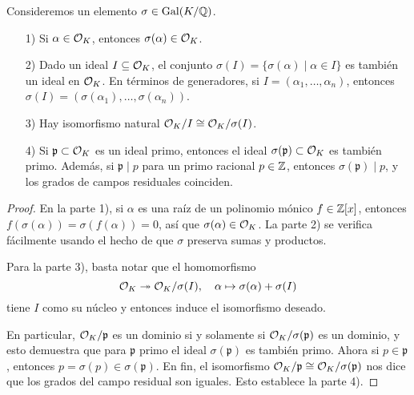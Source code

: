 \begin{proposicion}
  \label{prop:accion-sobre-los-ideales}
  Consideremos un elemento $\sigma \in \operatorname{Gal} (K/\mathbb{Q})$.

  \begin{enumerate}
  \item[1)] Si $\alpha \in \mathcal{O}_K$, entonces $\sigma (\alpha) \in \mathcal{O}_K$.

  \item[2)] Dado un ideal $I \subseteq \mathcal{O}_K$, el conjunto
    $\sigma (I) = \{ \sigma (\alpha) \mid \alpha \in I \}$
    es también un ideal en $\mathcal{O}_K$. En términos de generadores, si
    $I = (\alpha_1, \ldots, \alpha_n)$, entonces
    $\sigma (I) = (\sigma(\alpha_1), \ldots, \sigma(\alpha_n))$.

  \item[3)] Hay isomorfismo natural
    $\mathcal{O}_K/I \cong \mathcal{O}_K/\sigma(I)$.

  \item[4)] Si $\mathfrak{p} \subset \mathcal{O}_K$ es un ideal primo, entonces
    el ideal $\sigma (\mathfrak{p}) \subset \mathcal{O}_K$ es también primo.
    Además, si $\mathfrak{p} \mid p$ para un primo racional $p \in \mathbb{Z}$,
    entonces $\sigma(\mathfrak{p}) \mid p$, y los grados de campos residuales
    coinciden.
  \end{enumerate}

  \begin{proof}
    En la parte 1), si $\alpha$ es una raíz de un polinomio mónico
    $f \in \mathbb{Z} [x]$, entonces $f (\sigma (\alpha)) = \sigma (f (\alpha)) = 0$,
    así que $\sigma (\alpha) \in \mathcal{O}_K$. La parte 2) se verifica fácilmente
    usando el hecho de que $\sigma$ preserva sumas y productos.

    Para la parte 3), basta notar que el homomorfismo
    \[ \mathcal{O}_K \twoheadrightarrow \mathcal{O}_K/\sigma(I), \quad
       \alpha \mapsto \sigma (\alpha) + \sigma (I) \]
    tiene $I$ como su núcleo y entonces induce el isomorfismo deseado.

    En particular, $\mathcal{O}_K/\mathfrak{p}$ es un dominio si y solamente si
    $\mathcal{O}_K/\sigma(\mathfrak{p})$ es un dominio, y esto demuestra que
    para $\mathfrak{p}$ primo el ideal $\sigma (\mathfrak{p})$ es también
    primo. Ahora si $p \in \mathfrak{p}$, entonces
    $p = \sigma (p) \in \sigma (\mathfrak{p})$. En fin, el isomorfismo
    $\mathcal{O}_K/\mathfrak{p} \cong \mathcal{O}_K/\sigma(\mathfrak{p})$ nos dice que
    los grados del campo residual son iguales. Esto establece la parte 4).
  \end{proof}
\end{proposicion}

